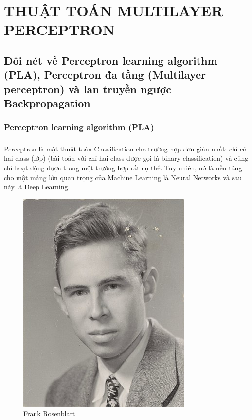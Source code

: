 \documentclass{report}
\begin{document}
\chapter{THUẬT TOÁN MULTILAYER PERCEPTRON}
\fontsize{16}{2}\selectfont
    \section{Đôi nét về Perceptron learning algorithm (PLA), Perceptron đa tầng (Multilayer perceptron) và lan truyền ngược Backpropagation}
        \fontsize{15}{10}\selectfont\subsection{Perceptron learning algorithm (PLA)}
            \fontsize{13}{10}\selectfont\paragraph{}
                Perceptron là một thuật toán Classification cho trường hợp đơn giản nhất: chỉ có hai class (lớp) (bài toán với chỉ hai class được gọi là binary classification) và cũng chỉ hoạt động được trong một trường hợp rất cụ thể. Tuy nhiên, nó là nền tảng cho một mảng lớn quan trọng của Machine Learning là Neural Networks và sau này là Deep Learning.
                    \begin{figure}
                        \includegraphics[scale=0.35]{image/330px-Rosenblatt_21.jpg}
                        \caption{\centering Frank Rosenblatt}
                    \end{figure}\leavevmode
                    
\end{document}
